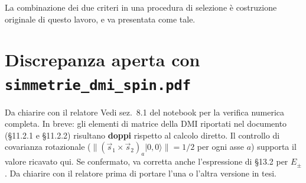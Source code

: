 \documentclass[11pt,a4paper]{article}
\begin{document}
La combinazione dei due criteri in una procedura di selezione è
costruzione originale di questo lavoro, e va presentata come tale.

\section{Discrepanza aperta con \texttt{simmetrie\_dmi\_spin.pdf}}

\begin{warnbox}{Da chiarire con il relatore}
Vedi sez.~8.1 del notebook per la verifica numerica completa. In
breve: gli elementi di matrice della DMI riportati nel documento
(\S 11.2.1 e \S 11.2.2) risultano \textbf{doppi} rispetto al calcolo
diretto. Il controllo di covarianza rotazionale
($\|(\vec s_1\times\vec s_2)_a|0,0\rangle\|=1/2$ per ogni asse $a$)
supporta il valore ricavato qui. Se confermato, va corretta anche
l'espressione di \S 13.2 per $E_\pm$. Da chiarire con il relatore
prima di portare l'una o l'altra versione in tesi.
\end{warnbox}
\end{document}
